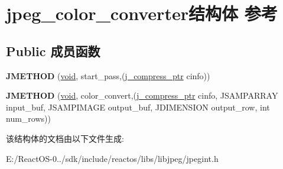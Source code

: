 \hypertarget{structjpeg__color__converter}{}\section{jpeg\+\_\+color\+\_\+converter结构体 参考}
\label{structjpeg__color__converter}
\subsection*{Public 成员函数}
\begin{DoxyCompactItemize}
\item 
\mbox{\label{structjpeg__color__converter_a1c9f24e568c3d4f67cb2021066825997}} 
{\bfseries J\+M\+E\+T\+H\+OD} (\hyperlink{interfacevoid}{void}, start\+\_\+pass,(\hyperlink{structjpeg__compress__struct}{j\+\_\+compress\+\_\+ptr} cinfo))
\item 
\mbox{\label{structjpeg__color__converter_aed90a059ad823add4785973694ed5eb9}} 
{\bfseries J\+M\+E\+T\+H\+OD} (\hyperlink{interfacevoid}{void}, color\+\_\+convert,(\hyperlink{structjpeg__compress__struct}{j\+\_\+compress\+\_\+ptr} cinfo, J\+S\+A\+M\+P\+A\+R\+R\+AY input\+\_\+buf, J\+S\+A\+M\+P\+I\+M\+A\+GE output\+\_\+buf, J\+D\+I\+M\+E\+N\+S\+I\+ON output\+\_\+row, int num\+\_\+rows))
\end{DoxyCompactItemize}


该结构体的文档由以下文件生成\+:\begin{DoxyCompactItemize}
\item 
E\+:/\+React\+O\+S-\/0../sdk/include/reactos/libs/libjpeg/jpegint.\+h\end{DoxyCompactItemize}
